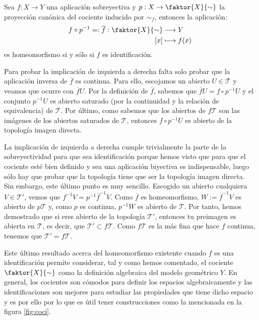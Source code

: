 \begin{prop}
Sea $f: X \rightarrow Y$ una aplicación sobreyectiva y $p: X \rightarrow \faktor{X}{\sim}$ la proyección canónica del cociente inducido por $\sim_f$, entonces la aplicación:
\begin{align*}
f\circ p^{-1} =: \overline{f} : \faktor{X}{\sim} & \longrightarrow Y \\
 			  [x] & \longmapsto f(x)
\end{align*}
es homeomorfismo si y sólo si $f$ es identificación.
\end{prop}
\begin{demo}
Para probar la implicación de izquierda a derecha falta solo probar que la aplicación inversa de $\overline{f}$ es continua. Para ello, escojamos un abierto $U \in \overline{\mathcal{T}}$ y veamos que ocurre con $\overline{f}U$. Por la definición de $\overline{f}$, sabemos que $\overline{f}U = f \circ p^{-1} U$ y el conjunto $p^{-1} U$ es abierto saturado (por la continuidad y la relación de equivalencia) de $\mathcal{T}$. Por último, como sabemos que los abiertos de $f\mathcal{T}$ son las imágenes de los abiertos saturados de $\mathcal{T}$, entonces $f\circ p^{-1} U$ es abierto de la topología imagen directa.

La implicación de izquierda a derecha cumple trivialmente la parte de la sobreyectividad para que sea identificación porque hemos visto que para que el cociente esté bien definido y sea una aplicación biyectiva es indispensable, luego sólo hay que probar que la topología tiene que ser la topología imagen directa. Sin embargo, este último punto es muy sencillo. Escogido un abierto cualquiera $V\in \mathcal{T}'$, vemos que $f^{-1}V = p^{-1}\overline{f}^{-1} V$. Como $\overline{f}$ es homeomorfismo, $ W := \overline{f}^{-1} V$ es abierto de $p\mathcal{T}$ y, como $p$ es continua, $p^{-1} W$ es abierto de $\mathcal{T}$. Por tanto, hemos demostrado que si eres abierto de la topología $\mathcal{T}'$, entonces tu preimagen es abierta en $\mathcal{T}$, es decir, que $\mathcal{T}' \subset f\mathcal{T}$. Como $f\mathcal{T}$ es la más fina que hace $f$ continua, tenemos que $\mathcal{T}' = f\mathcal{T}$.
\end{demo}

\begin{obs}
Este último resultado acerca del homeomorfismo existente cuando $f$ es una identificación permite considerar, tal y como hemos comentado, el cociente $\faktor{X}{\sim}$ como la definición algebraica del modelo geométrico $Y$. En general, los cocientes son cómodos para definir los espacios algebraicamente y las identificaciones son mejores para estudiar las propiedades que tiene dicho espacio y es por ello por lo que es útil tener construcciones como la mencionada en la figura \ref{fig:coci}.
\end{obs}

